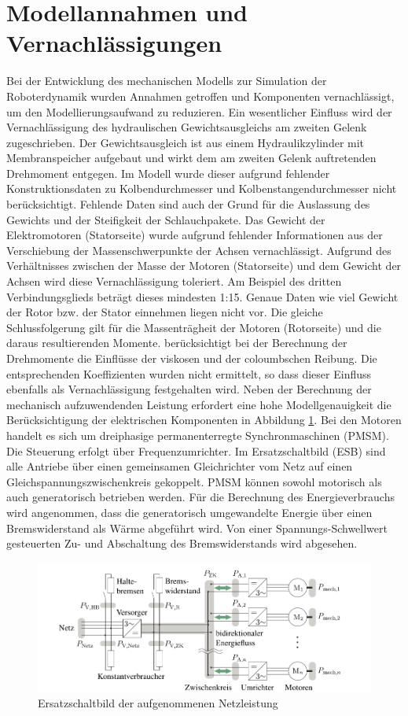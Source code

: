 \section{Modellannahmen und Vernachlässigungen}
Bei der Entwicklung des mechanischen Modells zur Simulation der Roboterdynamik wurden Annahmen getroffen und Komponenten vernachlässigt, um den Modellierungsaufwand zu reduzieren. Ein wesentlicher Einfluss wird der Vernachlässigung des hydraulischen Gewichtsausgleichs am zweiten Gelenk zugeschrieben. Der Gewichtsausgleich ist aus einem Hydraulikzylinder mit Membranspeicher aufgebaut und wirkt dem am zweiten Gelenk auftretenden Drehmoment entgegen. Im Modell wurde dieser aufgrund fehlender Konstruktionsdaten zu Kolbendurchmesser und Kolbenstangendurchmesser nicht berücksichtigt. Fehlende Daten sind auch der Grund für die Auslassung des Gewichts und der Steifigkeit der Schlauchpakete. Das Gewicht der Elektromotoren (Statorseite) wurde aufgrund fehlender Informationen aus der Verschiebung der Massenschwerpunkte der Achsen vernachlässigt. Aufgrund des Verhältnisses zwischen der Masse der Motoren (Statorseite) und dem Gewicht der Achsen  wird diese Vernachlässigung toleriert. Am Beispiel des dritten Verbindungsglieds beträgt dieses mindesten 1:15. Genaue Daten wie viel Gewicht der Rotor bzw. der Stator einnehmen liegen nicht vor.  Die gleiche Schlussfolgerung gilt für die Massenträgheit der Motoren (Rotorseite) und die daraus resultierenden Momente. \cite[S.~287~f.]{Grimble.2009} berücksichtigt bei der Berechnung der Drehmomente die Einflüsse der viskosen und der coloumbschen Reibung. Die entsprechenden Koeffizienten wurden nicht ermittelt, so dass dieser Einfluss ebenfalls als Vernachlässigung festgehalten wird. Neben der Berechnung der mechanisch aufzuwendenden Leistung erfordert eine hohe Modellgenauigkeit die Berücksichtigung der elektrischen Komponenten in Abbildung \ref{fig:zk}. Bei den Motoren handelt es sich um dreiphasige permanenterregte Synchronmaschinen (PMSM).  Die Steuerung erfolgt über Frequenzumrichter. Im Ersatzschaltbild (ESB) sind alle Antriebe über einen gemeinsamen Gleichrichter vom Netz auf einen Gleichspannungszwischenkreis gekoppelt. PMSM können sowohl motorisch als auch generatorisch betrieben werden. Für die Berechnung des Energieverbrauchs wird angenommen, dass die generatorisch umgewandelte Energie über einen Bremswiderstand als Wärme abgeführt wird. Von einer Spannungs-Schwellwert gesteuerten Zu- und Abschaltung des Bremswiderstands wird abgesehen. \cite[S.~21~ff.]{Eggers.2019}
%
\begin{figure}[tbph]
	\centering
	\includegraphics[width=0.8\linewidth]{images/zk}
	\caption{Ersatzschaltbild der aufgenommenen Netzleistung \cite[S.~20]{Eggers.2019}}
	\label{fig:zk}
\end{figure}